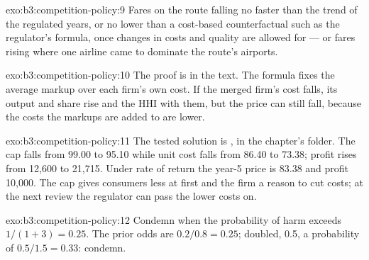 \begin{solution}{exo:b3:competition-policy:9}
Fares on the route falling no faster than the trend of the regulated years, or no
lower than a cost-based counterfactual such as the regulator's formula, once
changes in costs and quality are allowed for --- or fares rising where one airline
came to dominate the route's airports.
\end{solution}

\begin{solution}{exo:b3:competition-policy:10}
The proof is in the text. The formula fixes the average markup over each firm's own
cost. If the merged firm's cost falls, its output and share rise and the HHI with them,
but the price can still fall, because the costs the markups are added to are lower.
\end{solution}

\begin{solution}{exo:b3:competition-policy:11}
The tested solution is , in the chapter's 
folder. The cap falls from 99.00 to 95.10 while unit cost falls from 86.40 to 73.38; profit rises from 12{,}600
to 21{,}715. Under rate of return the year-5 price is 83.38 and profit 10{,}000. %
The cap gives consumers less at first and the firm a reason to cut costs; at the next
review the regulator can pass the lower costs on.
\end{solution}

\begin{solution}{exo:b3:competition-policy:12}
Condemn when the probability of harm exceeds $1/(1 + 3) = 0.25$. The prior odds are $0.2/0.8 = 0.25$; doubled, 0.5, a
probability of $0.5/1.5 = 0.33$: condemn.
\end{solution}

